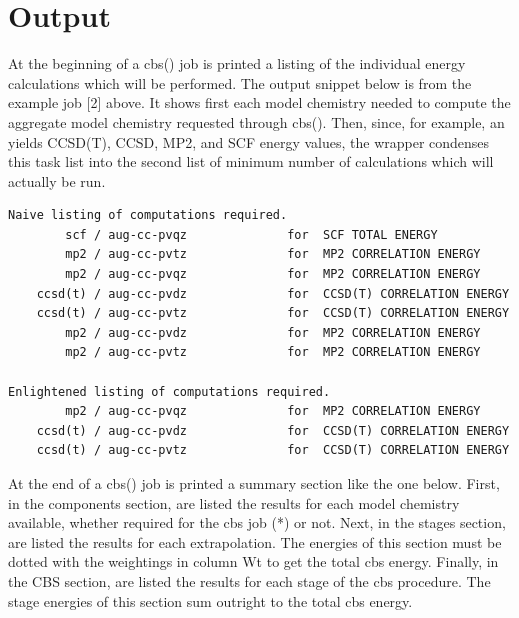 \documentclass[letterpaper,10pt,english]{sphinxmanual}
\begin{document}
\chapter{Output}
\label{cbs:output}\label{cbs::doc}
At the beginning of a cbs() job is printed a listing of the individual
energy calculations which will be performed. The output snippet below is
from the example job {[}2{]} above. It shows first each model chemistry needed
to compute the aggregate model chemistry requested through cbs(). Then,
since, for example, an  yields CCSD(T), CCSD, MP2,
and SCF energy values, the wrapper condenses this task list into the second
list of minimum number of calculations which will actually be run.

\begin{Verbatim}[commandchars=\\\{\}]
Naive listing of computations required.
        scf / aug-cc-pvqz              for  SCF TOTAL ENERGY
        mp2 / aug-cc-pvtz              for  MP2 CORRELATION ENERGY
        mp2 / aug-cc-pvqz              for  MP2 CORRELATION ENERGY
    ccsd(t) / aug-cc-pvdz              for  CCSD(T) CORRELATION ENERGY
    ccsd(t) / aug-cc-pvtz              for  CCSD(T) CORRELATION ENERGY
        mp2 / aug-cc-pvdz              for  MP2 CORRELATION ENERGY
        mp2 / aug-cc-pvtz              for  MP2 CORRELATION ENERGY

Enlightened listing of computations required.
        mp2 / aug-cc-pvqz              for  MP2 CORRELATION ENERGY
    ccsd(t) / aug-cc-pvdz              for  CCSD(T) CORRELATION ENERGY
    ccsd(t) / aug-cc-pvtz              for  CCSD(T) CORRELATION ENERGY
\end{Verbatim}

At the end of a cbs() job is printed a summary section like the one below. First,
in the components section, are listed the results for each model chemistry available, whether
required for the cbs job (*) or not. Next, in the stages section, are listed the results for
each extrapolation. The energies of this section must be dotted with the weightings in column Wt
to get the total cbs energy. Finally, in the CBS section, are listed the results for each stage
of the cbs procedure. The stage energies of this section sum outright to the total cbs energy.
\end{document}
